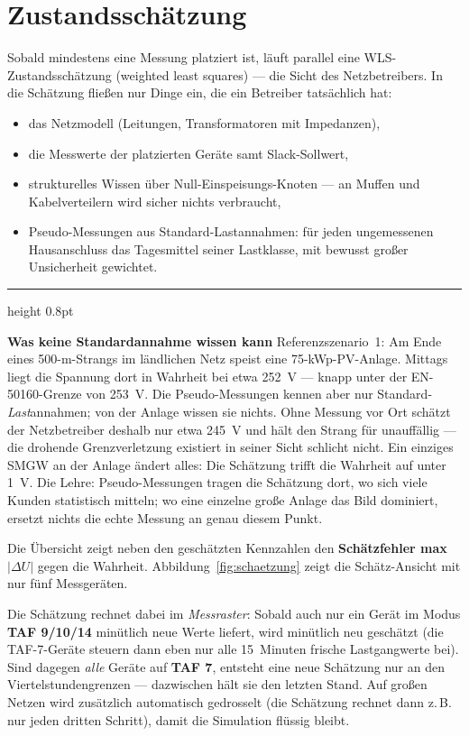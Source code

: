 \documentclass[11pt,a4paper,parskip=half]{scrreprt}
\newcommand{\ui}[1]{\textsf{\bfseries #1}}          %
\newenvironment{beispiel}[1][Beispiel]
  {\par\medskip
   {\color{bsp}\hrule height 0.8pt}\nopagebreak\smallskip
   \noindent\textbf{\textsf{\textcolor{bsp}{#1}}}\quad\ignorespaces}
  {\par\nopagebreak\smallskip{\color{bsp}\hrule height 0.8pt}\par\medskip}
\begin{document}
\section{Zustandsschätzung}

Sobald mindestens eine Messung platziert ist, läuft parallel eine
WLS-Zu\-stands\-schät\-zung (weighted least squares) --- die Sicht des
Netzbetreibers. In die Schätzung fließen nur Dinge ein, die ein
Betreiber tatsächlich hat:

\begin{itemize}[nosep]
  \item das Netzmodell (Leitungen, Transformatoren mit Impedanzen),
  \item die Messwerte der platzierten Geräte samt Slack-Sollwert,
  \item strukturelles Wissen über Null-Einspeisungs-Knoten ---
    an Muffen und Kabelverteilern wird sicher nichts verbraucht,
  \item Pseudo-Messungen aus Standard-Lastannahmen: für jeden
    ungemessenen Hausanschluss das Tagesmittel seiner Lastklasse,
    mit bewusst großer Unsicherheit gewichtet.
\end{itemize}

\begin{beispiel}[Was keine Standardannahme wissen kann]
Referenzszenario~1: Am Ende eines 500-m-Strangs im ländlichen Netz
speist eine 75-kWp-PV-Anlage. Mittags liegt die Spannung dort in
Wahrheit bei etwa 252~V --- knapp unter der EN-50160-Grenze von
253~V. Die Pseudo-Messungen kennen aber nur
Standard-\emph{Last}annahmen; von der Anlage wissen sie nichts.
Ohne Messung vor Ort schätzt der Netzbetreiber deshalb nur etwa
245~V und hält den Strang für unauffällig --- die drohende
Grenzverletzung existiert in seiner Sicht schlicht nicht. Ein
einziges SMGW an der Anlage ändert alles: Die Schätzung trifft die
Wahrheit auf unter 1~V. Die Lehre: Pseudo-Messungen tragen die
Schätzung dort, wo sich viele Kunden statistisch mitteln; wo eine
einzelne große Anlage das Bild dominiert, ersetzt nichts die echte
Messung an genau diesem Punkt.
\end{beispiel}

Die Übersicht zeigt neben den geschätzten Kennzahlen den
\ui{Schätzfehler max $|\Delta U|$} gegen die Wahrheit.
Abbildung~\ref{fig:schaetzung} zeigt die Schätz-Ansicht mit nur fünf
Messgeräten.

Die Schätzung rechnet dabei im \emph{Messraster}: Sobald auch nur
ein Gerät im Modus \ui{TAF 9/10/14} minütlich neue Werte liefert,
wird minütlich neu geschätzt (die TAF-7-Geräte steuern dann eben nur
alle 15~Minuten frische Lastgangwerte bei). Sind dagegen
\emph{alle} Geräte auf \ui{TAF 7}, entsteht eine neue Schätzung nur
an den Viertelstundengrenzen --- dazwischen hält sie den letzten
Stand. Auf großen Netzen wird zusätzlich automatisch gedrosselt
(die Schätzung rechnet dann z.\,B. nur jeden dritten Schritt),
damit die Simulation flüssig bleibt.
\end{document}
